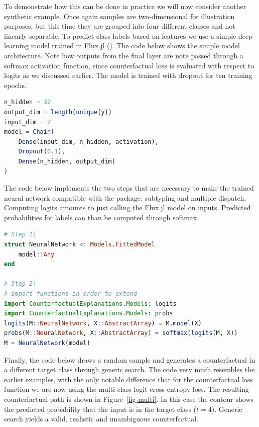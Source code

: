 \documentclass{juliacon}
\begin{document}
To demonstrate how this can be done in practice we will now consider
another synthetic example. Once again samples are two-dimensional for
illustration purposes, but this time they are grouped into four
different classes and not linearly separable. To predict class labels
based on features we use a simple deep-learning model trained in
\href{https://fluxml.ai/}{Flux.jl} (\cite{innes2018flux}). The code
below shows the simple model architecture. Note how outputs from the
final layer are note passed through a softmax activation function, since
counterfactual loss is evaluated with respect to logits as we discussed
earlier. The model is trained with dropout for ten training epochs.

\begin{lstlisting}[language = Julia]
n_hidden = 32
output_dim = length(unique(y))
input_dim = 2
model = Chain(
    Dense(input_dim, n_hidden, activation),
    Dropout(0.1),
    Dense(n_hidden, output_dim)
)  
\end{lstlisting}

The code below implements the two steps that are necessary to make the
trained neural network compatible with the package: subtyping and
multiple dispatch. Computing logits amounts to just calling the Flux.jl
model on inputs. Predicted probabilities for labels can than be computed
through softmax.

\begin{lstlisting}[language = Julia]
# Step 1)
struct NeuralNetwork <: Models.FittedModel
    model::Any
end

# Step 2)
# import functions in order to extend
import CounterfactualExplanations.Models: logits
import CounterfactualExplanations.Models: probs 
logits(M::NeuralNetwork, X::AbstractArray) = M.model(X)
probs(M::NeuralNetwork, X::AbstractArray) = softmax(logits(M, X))
M = NeuralNetwork(model)
\end{lstlisting}

Finally, the code below draws a random sample and generates a
counterfactual in a different target class through generic search. The
code very much resembles the earlier examples, with the only notable
difference that for the counterfactual loss function we are now using
the multi-class logit cross-entropy loss. The resulting counterfactual
path is shown in Figure~\ref{fig-multi}. In this case the contour shows
the predicted probability that the input is in the target class
(\(t=4\)). Generic search yields a valid, realistic and unambiguous
counterfactual.
\end{document}
